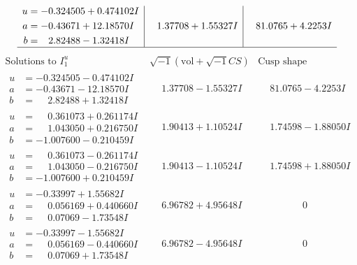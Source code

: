 \documentclass[1p]{elsarticle_modified}
\theoremstyle{definition}
\newcommand{\I}{\sqrt{-1}}
\begin{document}
$$\begin{array}{c|c|c}
\begin{aligned}
u &= -0.324505 + 0.474102 I \\
a &= -0.43671 + 12.18570 I \\
b &= \phantom{-}2.82488 - 1.32418 I\end{aligned}
 & \phantom{-}1.37708 + 1.55327 I & \phantom{-}81.0765 + 4.2253 I\\
 \hline 
 \end{array}$$\newpage$$\begin{array}{c|c|c}  
\text{Solutions to }I^u_{1}& \I (\text{vol} + \sqrt{-1}CS) & \text{Cusp shape}\\
 \hline 
\begin{aligned}
u &= -0.324505 - 0.474102 I \\
a &= -0.43671 - 12.18570 I \\
b &= \phantom{-}2.82488 + 1.32418 I\end{aligned}
 & \phantom{-}1.37708 - 1.55327 I & \phantom{-}81.0765 - 4.2253 I \\ \hline\begin{aligned}
u &= \phantom{-}0.361073 + 0.261174 I \\
a &= \phantom{-}1.043050 + 0.216750 I \\
b &= -1.007600 - 0.210459 I\end{aligned}
 & \phantom{-}1.90413 + 1.10524 I & \phantom{-}1.74598 - 1.88050 I \\ \hline\begin{aligned}
u &= \phantom{-}0.361073 - 0.261174 I \\
a &= \phantom{-}1.043050 - 0.216750 I \\
b &= -1.007600 + 0.210459 I\end{aligned}
 & \phantom{-}1.90413 - 1.10524 I & \phantom{-}1.74598 + 1.88050 I \\ \hline\begin{aligned}
u &= -0.33997 + 1.55682 I \\
a &= \phantom{-}0.056169 + 0.440660 I \\
b &= \phantom{-}0.07069 - 1.73548 I\end{aligned}
 & \phantom{-}6.96782 + 4.95648 I & \phantom{-0.000000 } 0 \\ \hline\begin{aligned}
u &= -0.33997 - 1.55682 I \\
a &= \phantom{-}0.056169 - 0.440660 I \\
b &= \phantom{-}0.07069 + 1.73548 I\end{aligned}
 & \phantom{-}6.96782 - 4.95648 I & \phantom{-0.000000 } 0 \\ \hline\begin{aligned}

\end{aligned}
\end{array}$$
\end{document}
